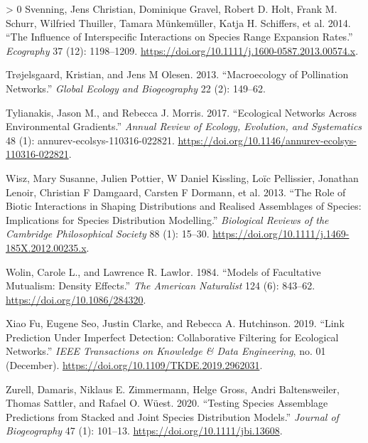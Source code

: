 \documentclass[11pt]{article}
\newlength{\cslhangindent}
\newenvironment{CSLReferences}[3] %
 {%
  \setlength{\parindent}{0pt}
  \ifodd #1 \everypar{\setlength{\hangindent}{\cslhangindent}}\ignorespaces\fi
  \ifnum #2 > 0
  \setlength{\parskip}{#2\baselineskip}
  \fi
 }%
 {}
\begin{document}
\begin{CSLReferences}{1}{0}
\leavevmode\hypertarget{ref-Svenning2014InfInt}{}%
Svenning, Jens Christian, Dominique Gravel, Robert D. Holt, Frank M.
Schurr, Wilfried Thuiller, Tamara Münkemüller, Katja H. Schiffers, et
al. 2014. {``The Influence of Interspecific Interactions on Species
Range Expansion Rates.''} \emph{Ecography} 37 (12): 1198--1209.
\url{https://doi.org/10.1111/j.1600-0587.2013.00574.x}.

\leavevmode\hypertarget{ref-Trojelsgaard2013MacPol}{}%
Trøjelsgaard, Kristian, and Jens M Olesen. 2013. {``Macroecology of
Pollination Networks.''} \emph{Global Ecology and Biogeography} 22 (2):
149--62.

\leavevmode\hypertarget{ref-Tylianakis2017EcoNet}{}%
Tylianakis, Jason M., and Rebecca J. Morris. 2017. {``Ecological
Networks Across Environmental Gradients.''} \emph{Annual Review of
Ecology, Evolution, and Systematics} 48 (1):
annurev-ecolsys-110316-022821.
\url{https://doi.org/10.1146/annurev-ecolsys-110316-022821}.

\leavevmode\hypertarget{ref-Wisz2013RolBio}{}%
Wisz, Mary Susanne, Julien Pottier, W Daniel Kissling, Loïc Pellissier,
Jonathan Lenoir, Christian F Damgaard, Carsten F Dormann, et al. 2013.
{``The Role of Biotic Interactions in Shaping Distributions and Realised
Assemblages of Species: Implications for Species Distribution
Modelling.''} \emph{Biological Reviews of the Cambridge Philosophical
Society} 88 (1): 15--30.
\url{https://doi.org/10.1111/j.1469-185X.2012.00235.x}.

\leavevmode\hypertarget{ref-Wolin1984ModFac}{}%
Wolin, Carole L., and Lawrence R. Lawlor. 1984. {``Models of Facultative
Mutualism: Density Effects.''} \emph{The American Naturalist} 124 (6):
843--62. \url{https://doi.org/10.1086/284320}.

\leavevmode\hypertarget{ref-XiaoFu2019LinPre}{}%
Xiao Fu, Eugene Seo, Justin Clarke, and Rebecca A. Hutchinson. 2019.
{``Link Prediction Under Imperfect Detection: Collaborative Filtering
for Ecological Networks.''} \emph{IEEE Transactions on Knowledge \& Data
Engineering}, no. 01 (December).
\url{https://doi.org/10.1109/TKDE.2019.2962031}.

\leavevmode\hypertarget{ref-Zurell2020TesSpe}{}%
Zurell, Damaris, Niklaus E. Zimmermann, Helge Gross, Andri
Baltensweiler, Thomas Sattler, and Rafael O. Wüest. 2020. {``Testing
Species Assemblage Predictions from Stacked and Joint Species
Distribution Models.''} \emph{Journal of Biogeography} 47 (1): 101--13.
\url{https://doi.org/10.1111/jbi.13608}.

\end{CSLReferences}
\end{document}
